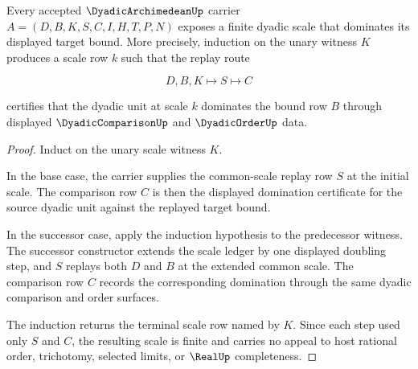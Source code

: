 \begin{theorem}
\label{thm:dyadic-archimedean-scale-existence}
Every accepted $\DyadicArchimedeanUp$ carrier $A=(D,B,K,S,C,I,H,T,P,N)$ exposes a finite dyadic scale that dominates its displayed target bound. More precisely, induction on the unary witness $K$ produces a scale row $k$ such that the replay route

$$
D,B,K \longmapsto S \longmapsto C
$$

certifies that the dyadic unit at scale $k$ dominates the bound row $B$ through displayed $\DyadicComparisonUp$ and $\DyadicOrderUp$ data.
\end{theorem}
\begin{proof}
Induct on the unary scale witness $K$.

In the base case, the carrier supplies the common-scale replay row $S$ at the initial scale. The comparison row $C$ is then the displayed domination certificate for the source dyadic unit against the replayed target bound.

In the successor case, apply the induction hypothesis to the predecessor witness. The successor constructor extends the scale ledger by one displayed doubling step, and $S$ replays both $D$ and $B$ at the extended common scale. The comparison row $C$ records the corresponding domination through the same dyadic comparison and order surfaces.

The induction returns the terminal scale row named by $K$. Since each step used only $S$ and $C$, the resulting scale is finite and carries no appeal to host rational order, trichotomy, selected limits, or $\RealUp$ completeness.
\end{proof}


